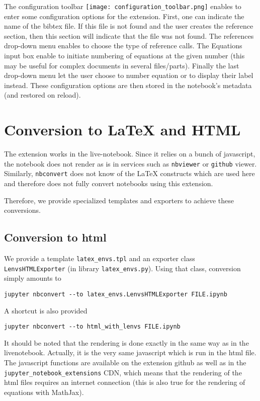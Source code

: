     The configuration toolbar \texttt{[image: configuration\_toolbar.png]}
enables to enter some configuration options for the extension. First,
one can indicate the name of the bibtex file. If this file is not found
and the user creates the reference section, then this section will
indicate that the file was not found. The references drop-down menu
enables to choose the type of reference calls. The Equations input box
enable to initiate numbering of equations at the given number (this may
be useful for complex documents in several files/parts). Finally the
last drop-down menu let the user choose to number equation or to display
their label instead. These configuration options are then stored in the
notebook's metadata (and restored on reload).

    \section{Conversion to LaTeX and
HTML}\label{conversion-to-latex-and-html}

    The extension works in the live-notebook. Since it relies on a bunch of
javascript, the notebook does not render as is in services such as
\texttt{nbviewer} or \texttt{github} viewer. Similarly,
\texttt{nbconvert} does not know of the LaTeX constructs which are used
here and therefore does not fully convert notebooks using this
extension.

Therefore, we provide specialized templates and exporters to achieve
these conversions.

    \subsection{Conversion to html}\label{conversion-to-html}

We provide a template \texttt{latex\_envs.tpl} and an exporter class
\texttt{LenvsHTMLExporter} (in library \texttt{latex\_envs.py}). Using
that class, conversion simply amounts to

\begin{verbatim}
jupyter nbconvert --to latex_envs.LenvsHTMLExporter FILE.ipynb
\end{verbatim}

A shortcut is also provided

\begin{verbatim}
jupyter nbconvert --to html_with_lenvs FILE.ipynb
\end{verbatim}

It should be noted that the rendering is done exactly in the same way as
in the livenotebook. Actually, it is the very same javascript which is
run in the html file. The javascript functions are available on the
extension github as well as in the
\texttt{jupyter\_notebook\_extensions} CDN, which means that the
rendering of the html files requires an internet connection (this is
also true for the rendering of equations with MathJax).

